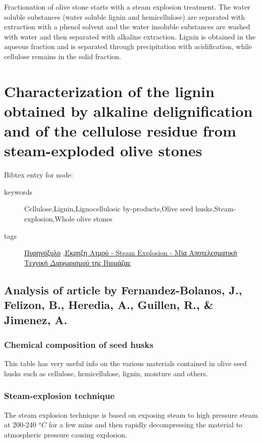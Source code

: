 \documentclass[11pt]{article}
\begin{document}
Fractionation of olive stone starts with a steam explosion treatment. The water soluble substances (water soluble lignin and hemicellulose) are separated with extraction with a phenol solvent and the water insoluble substances are washed with water and then separated with alkaline extraction. Lignin is obtained in the aqueous fraction and is separated through precipitation with acidification, while cellulose remains in the solid fraction. 

\section{Characterization of the lignin obtained by alkaline delignification and of the cellulose residue from steam-exploded olive stones}
\label{sec:org888a656}
Bibtex entry for node: \cite{fernandez-bolanosCharacterizationLigninObtained1999}

\begin{description}
\item[{keywords}] Cellulose,Lignin,Lignocellulosic by-products,Olive seed husks,Steam-explosion,Whole olive stones
\item[{tags}] \href{\detokenize{../../../../org_roam/πυρηνοξυλο-08-11-22.org}}{Πυρηνόξυλο} ,\href{\detokenize{../../../../org_roam/εκρηξη_ατμου_steam_explosion_μια_αποτελεσματικη_τεχνικη_διαχωρισμου_της_βιομαζας-08-11-22.org}}{Έκρηξη Ατμού - Steam Explosion - Μία Αποτελεσματική Τεχνική Διαχωρισμού της Βιομάζας}
\end{description}

\subsection{Analysis of article by Fernandez-Bolanos, J., Felizon, B., Heredia, A., Guillen, R., \& Jimenez, A.}
\label{sec:orgf9ff075}
\subsubsection{Chemical composition of seed husks}
\label{sec:org321f314}
This table has very useful info on the various materials contained in olive seed husks such as cellulose, hemicellulose, lignin, moisture and others.
\subsubsection{Steam-explosion technique}
\label{sec:org65ef46a}
The steam explosion technique is based on exposing steam to high pressure steam at 200-240 \(^oC\) for a few mins and then rapidly decompressing the material to atmospheric pressure causing explosion.
\end{document}
